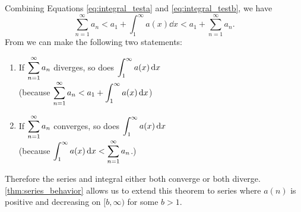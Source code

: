 Combining Equations \eqref{eq:integral_testa} and \eqref{eq:integral_testb}, we have
\begin{equation}
\sum_{n=1}^\infty a_n< a_1 +\int_1^\infty a(x)\dd x < a_1 + \sum_{n=1}^\infty a_n.\label{eq:integral_testc}
\end{equation}
From  we can make the following two statements:
\begin{enumerate}
	\item If $\displaystyle \sum_{n=1}^\infty a_n$ diverges, so does $\displaystyle\int_1^\infty a(x)\operatorname{d}\! x$ \\\hfill(because $\displaystyle \sum_{n=1}^\infty a_n < a_1 +\int_1^\infty a(x)\operatorname{d}\! x$)
	\item	If $\displaystyle \sum_{n=1}^\infty a_n$ converges, so does $\displaystyle\int_1^\infty a(x)\operatorname{d}\! x$ \\\hfill(because $\displaystyle \displaystyle \int_1^\infty a(x)\operatorname{d}\! x < \sum_{n=1}^\infty a_n$.)
\end{enumerate}
Therefore the series and integral either both converge or both diverge. \autoref{thm:series_behavior} allows us to extend this theorem to series where $a(n)$ is positive and decreasing on $[b,\infty)$ for some $b>1$.



